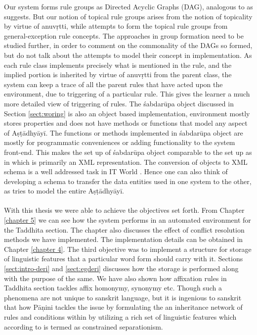 \documentclass[a4paper,11pt,twoside,openright]{report}
\begin{document}
Our system forms rule groups as Directed Acyclic Graphs (DAG), analogous to as  suggests. But our notion of topical rule groups  arises from the notion of topicality by virtue of anuvṛtti, while  attempts to form the topical rule groups from general-exception rule concepts. The approaches in group formation need to be studied further, in order to comment on the commonality of the DAGs so formed, but  do not talk about the attempts to model their concept in implementation. As each rule class implements precisely what is mentioned in the rule, and the implied portion is inherited by virtue of anuvṛtti from the parent class, the system can keep a trace of all the parent rules that have acted upon the environment, due to triggering of a particular rule. This gives the learner a much more detailed view of triggering of rules. The śabdarūpa object discussed in Section \ref{sect:woring} is also an object based implementation, environment mostly stores properties and does not have methods or functions that model any aspect of Aṣṭādhyāyī. The functions or methods implemented in śabdarūpa object are mostly for programmatic conveniences or adding functionality to the system front-end. This makes the set up of śabdarūpa object comparable to the set up as in  which is primarily an XML representation. The conversion of objects to XML schema is a well addressed task in IT World \cite{jain2002xml}. Hence one can also think of developing a schema to transfer the data entities used in one system to the other, as  tries to model the entire Aṣṭādhyāyī.  
\\ \\
With this thesis we were able to achieve the objectives set forth. From Chapter \ref{chapter 5} we can see how the system performs in an automated environment for the Taddhita section. The chapter also discusses the effect of conflict resolution methods we have implemented. The implementation details can be obtained in Chapter \ref{chapter 4}. The third objective was to implement a structure for storage of linguistic features that a particular word form should carry with it. Sections \ref{sect:intro-deri} and \ref{sect:egderi} discusses how the storage is performed along with the purpose of the same. We have also shown how affixation rules in Taddhita section tackles affix homonymy, synonymy etc. Though such a phenomena are not unique to sanskrit language, but it is ingenious to sanskrit that how Pāṇini tackles the issue by formulating the an inheritance network of rules and conditions within by utilizing a rich set of linguistic features which according to  is termed as constrained separationism.  
\end{document}
